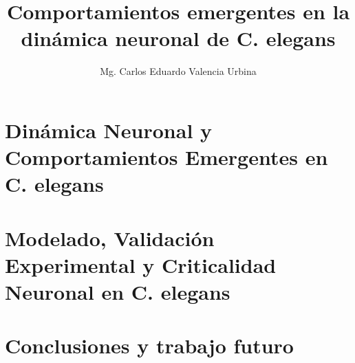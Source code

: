 \documentclass[12pt,screen,twoside,pagebackref]{ibtesis}
\title{Comportamientos emergentes en la dinámica neuronal de C. elegans }
\author{Mg. Carlos Eduardo Valencia Urbina}
\begin{document}

\begin{preliminary}




\tableofcontents                %

\listoffigures                  %

\listoftables                   %

\printunsrtglossaries %





\end{preliminary}






\part{Dinámica Neuronal y Comportamientos Emergentes en C. elegans}\label{sec:parteI}





\part{Modelado, Validación Experimental y Criticalidad Neuronal en C. elegans}\label{sec:parteII}








\part{Conclusiones y trabajo futuro}

\end{document}
